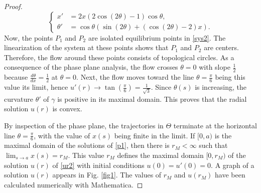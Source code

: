 \documentclass[10pt,a4paper]{amsart}
\begin{document}
\begin{proof}
\begin{equation}\label{sys2}
\left\{
\begin{split}
 x' &= 2x(2\cos(2\theta)-1)\cos\theta, \\ 
\theta '&= \cos\theta (\sin(2\theta)+(\cos(2\theta)-2)x ).
\end{split}\right.
\end{equation}
Now, the points $P_1$ and $P_2$ are isolated equilibrium points in \eqref{sys2}. The linearization of the system at these points shows that   $P_1$ and $P_2$ are centers. Therefore, the flow around these points consists of  topological circles. As a consequence of the phase plane analysis, the flow crosses $\theta=0$ with slope $\frac12$ because $\frac{d\theta}{dx}=\frac12$ at $\theta=0$. Next, the flow moves toward the line $\theta=\frac{\pi}{6}$ being this value its limit, hence   $u'(r)\to \tan(\frac{\pi}{6})=\frac{1}{\sqrt{3}}$. Since $\theta(s)$ is increasing,  the curvature $\theta'$ of  $\gamma$ is positive in its maximal domain. This proves that the radial solution $u(r)$ is convex. 

By inspection of the phase plane, the trajectories in $\Theta$ terminate at the horizontal line $\theta=\frac{\pi}{6}$, with the value of $x(s)$ being finite in the limit. If $[0,a)$ is the maximal domain of the solutions of \eqref{p1}, then   there is $r_M<\infty$ such that $\lim_{s\to a}x(s)=r_M$.  This value $r_M$ defines the maximal domain $[0,r_M)$ of the solution $u(r)$ of \eqref{ur2} with initial conditions $u(0)=u'(0)=0$. A  graph of a solution $u(r)$ appears in   Fig. \ref{fig1}. The values of $r_M$ and $u(r_M)$ have been calculated numerically with Mathematica.
\end{proof}
\end{document}
